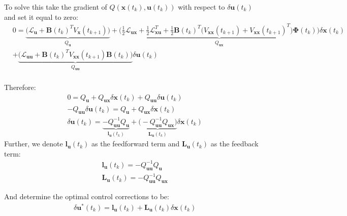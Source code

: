 \documentclass[11pt]{homework}
\renewcommand{\vec}[1]{\ensuremath{\boldsymbol{#1}}}
\begin{document}
\begin{arabicparts}
			
		To solve this take the gradient of $Q(\vec{x}(t_{k}), \vec{u}(t_{k}))$ with respect to $\delta\vec{u}(t_{k})$ and set it equal to zero:
			\begin{align*}
				& 0 = \underbrace{\Big(\mathcal{L}_{\vec{u}} + \vec{B}(t_{k})^{T}V_{\vec{x}}(t_{k+1})\Big)}_{Q_{\vec{u}}} +  \underbrace{\Bigg( \frac{1}{2}\mathcal{L}_{\vec{ux}} + \frac{1}{2}\mathcal{L}_{\vec{xu}}^{T} + \frac{1}{2}\vec{B}(t_{k})^{T}\Big(V_{\vec{xx}}(t_{k+1}) + V_{\vec{xx}}(t_{k+1})^{T}\Big) \vec{\Phi}(t_{k})  \Bigg)}_{Q_{\vec{ux}}}\delta\vec{x}(t_{k}) \\
				& + \underbrace{\Big( \mathcal{L}_{\vec{uu}} + \vec{B}(t_{k})^{T}V_{\vec{xx}}(t_{k+1})\vec{B}(t_{k})\Big)}_{Q_{\vec{uu}}}\delta\vec{u}(t_{k}) \\
			\end{align*}
	
		Therefore: 
			\begin{align*}
				& 0 = Q_{\vec{u}} + Q_{\vec{ux}}\delta\vec{x}(t_{k})  + Q_{\vec{uu}}\delta\vec{u}(t_{k}) \\
				& -Q_{\vec{uu}}\delta\vec{u}(t_{k}) = Q_{\vec{u}} + Q_{\vec{ux}}\delta\vec{x}(t_{k})  \\
				& \delta\vec{u}(t_{k}) = \underbrace{-Q_{\vec{uu}}^{-1}Q_{\vec{u}}}_{\vec{l}_{\vec{u}}(t_{k})} + \underbrace{\Big(-Q_{\vec{uu}}^{-1} Q_{\vec{ux}}\Big)}_{\vec{L}_{\vec{u}}(t_{k})}\delta\vec{x}(t_{k}) 
			\end{align*}
		Further, we denote $\vec{l}_{\vec{u}}(t_{k})$ as the feedforward term and $\vec{L}_{\vec{u}}(t_{k})$ as the feedback term: 
			\begin{align*}
				& \vec{l}_{\vec{u}}(t_{k}) = -Q_{\vec{uu}}^{-1}Q_{\vec{u}} \\
				& \vec{L}_{\vec{u}}(t_{k}) = -Q_{\vec{uu}}^{-1}Q_{\vec{ux}}
			\end{align*}
		
		And determine  the optimal control corrections to be: 
			\begin{align*}
				& \delta\vec{u}^{*}(t_{k}) = \vec{l}_{\vec{u}}(t_{k}) + \vec{L}_{\vec{u}}(t_{k})\delta\vec{x}(t_{k})\\
			\end{align*}



\end{arabicparts}
\end{document}
